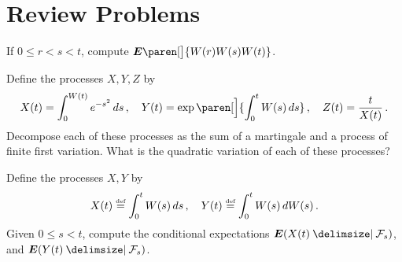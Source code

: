 \section{Review Problems}

\begin{problem}
  If $0 \leq r < s < t$, compute $\E \paren[\big]{ W(r) W(s) W(t)}$.
\end{problem}

\begin{problem}
  Define the processes $X, Y, Z$ by
  \begin{equation*}
    X(t) = \int_0^{W(t)} e^{-s^2} \, ds\,,
    \quad
    Y(t) = \exp\paren[\Big]{ \int_0^t W(s) \, ds }\,,
    \quad
    Z(t) = \frac{t}{X(t)}\,.
  \end{equation*}
  Decompose each of these processes as the sum of a martingale and a process of finite first variation.
  What is the quadratic variation of each of these processes?
\end{problem}

\begin{problem}
  Define the processes $X, Y$ by
  \begin{equation*}
    X(t) \stackrel{\scriptscriptstyle\textup{def}}{=} \int_0^t W(s) \, ds\,, \quad
    Y(t) \stackrel{\scriptscriptstyle\textup{def}}{=} \int_0^t W(s) \, dW(s)\,.
  \end{equation*}
  Given $0 \leq s < t$, compute the conditional expectations
  $\E( X(t) \given \mathcal F_s )$, 
  and
  $\E( Y(t) \given \mathcal F_s )$.
\end{problem}

